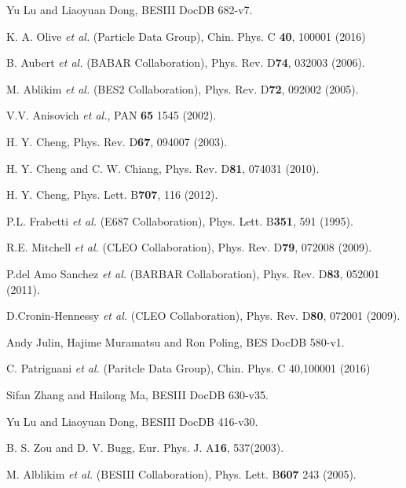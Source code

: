\newpage
\begin{thebibliography}{99}

Yu Lu and Liaoyuan Dong, 
BESIII DocDB 682-v7.

K. A. Olive {\it et al.} (Particle Data Group), 
Chin. Phys. C \textbf{40}, 100001 (2016)

B. Aubert {\it et al.}  (BABAR Collaboration),
Phys. Rev. D\textbf{74}, 032003 (2006).

M. Ablikim {\it et al.}  (BES2 Collaboration),
Phys. Rev. D\textbf{72}, 092002 (2005).

V.V. Anisovich {\it et al.},
PAN \textbf{65} 1545 (2002).

    H. Y. Cheng,
    Phys. Rev. D\textbf{67}, 094007 (2003).

    H. Y. Cheng and C. W. Chiang,
    Phys. Rev. D\textbf{81}, 074031 (2010).

    H. Y. Cheng,
    Phys. Lett. B\textbf{707}, 116 (2012).

    P.L. Frabetti {\it et al.}  (E687 Collaboration),
    Phys. Lett. B\textbf{351}, 591 (1995).

R.E. Mitchell {\it et al.}  (CLEO Collaboration),
Phys. Rev. D\textbf{79}, 072008 (2009).

P.del Amo Sanchez {\it et al.}  (BARBAR Collaboration),
Phys. Rev. D\textbf{83}, 052001 (2011).


D.Cronin-Hennessy {\it et al.}  (CLEO Collaboration),
Phys. Rev. D\textbf{80}, 072001 (2009).

Andy Julin, Hajime Muramatsu and Ron Poling,  
BES\uppercase\expandafter{} DocDB 580-v1.

C. Patrignani {\it et al.}  (Paritcle Data Group),
Chin. Phys. C 40,100001 (2016)

Sifan Zhang and Hailong Ma, 
BESIII DocDB 630-v35.

Yu Lu and Liaoyuan Dong, 
BESIII DocDB 416-v30.

B. S. Zou and D. V. Bugg, 
Eur. Phys. J. A\textbf{16}, 537(2003).

M. Alblikim {\it et al.}  (BESIII Collaboration),
Phys. Lett. B\textbf{607} 243 (2005).


\end{thebibliography}
